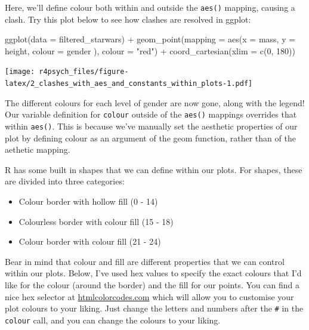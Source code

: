 \documentclass[
]{book}
\newenvironment{Shaded}{\begin{snugshade}}{\end{snugshade}}
\newcommand{\AttributeTok}[1]{\textcolor[rgb]{0.77,0.63,0.00}{#1}}
\newcommand{\DecValTok}[1]{\textcolor[rgb]{0.00,0.00,0.81}{#1}}
\newcommand{\FunctionTok}[1]{\textcolor[rgb]{0.00,0.00,0.00}{#1}}
\newcommand{\NormalTok}[1]{#1}
\newcommand{\SpecialCharTok}[1]{\textcolor[rgb]{0.00,0.00,0.00}{#1}}
\newcommand{\StringTok}[1]{\textcolor[rgb]{0.31,0.60,0.02}{#1}}
\providecommand{\tightlist}{%
  \setlength{\itemsep}{0pt}\setlength{\parskip}{0pt}}
\begin{document}
Here, we'll define colour both within and outside the \texttt{aes()} mapping, causing a clash. Try this plot below to see how clashes are resolved in ggplot:

\begin{Shaded}
\begin{Highlighting}[]
\FunctionTok{ggplot}\NormalTok{(}\AttributeTok{data =}\NormalTok{ filtered\_starwars) }\SpecialCharTok{+}
  \FunctionTok{geom\_point}\NormalTok{(}\AttributeTok{mapping =} \FunctionTok{aes}\NormalTok{(}\AttributeTok{x =}\NormalTok{ mass, }
                           \AttributeTok{y =}\NormalTok{ height, }
                           \AttributeTok{colour =}\NormalTok{ gender}
\NormalTok{                           ),}
             \AttributeTok{colour =} \StringTok{"red"}\NormalTok{) }\SpecialCharTok{+}
  \FunctionTok{coord\_cartesian}\NormalTok{(}\AttributeTok{xlim =} \FunctionTok{c}\NormalTok{(}\DecValTok{0}\NormalTok{, }\DecValTok{180}\NormalTok{))}
\end{Highlighting}
\end{Shaded}

\texttt{[image: r4psych\_files/figure-latex/2\_clashes\_with\_aes\_and\_constants\_within\_plots-1.pdf]}

The different colours for each level of gender are now gone, along with the legend! Our variable definition for \texttt{colour} outside of the \texttt{aes()} mappings overrides that within \texttt{aes()}. This is because we've manually set the aesthetic properties of our plot by defining colour as an argument of the geom function, rather than of the aethetic mapping.

R has some built in shapes that we can define within our plots. For shapes, these are divided into three categories:

\begin{itemize}
\tightlist
\item
  Colour border with hollow fill (0 - 14)
\item
  Colourless border with colour fill (15 - 18)
\item
  Colour border with colour fill (21 - 24)
\end{itemize}

Bear in mind that colour and fill are different properties that we can control within our plots. Below, I've used hex values to specify the exact colours that I'd like for the colour (around the border) and the fill for our points. You can find a nice hex selector at \href{http://htmlcolorcodes.com/}{htmlcolorcodes.com} which will allow you to customise your plot colours to your liking. Just change the letters and numbers after the \texttt{\#} in the \texttt{colour} call, and you can change the colours to your liking.
\end{document}
